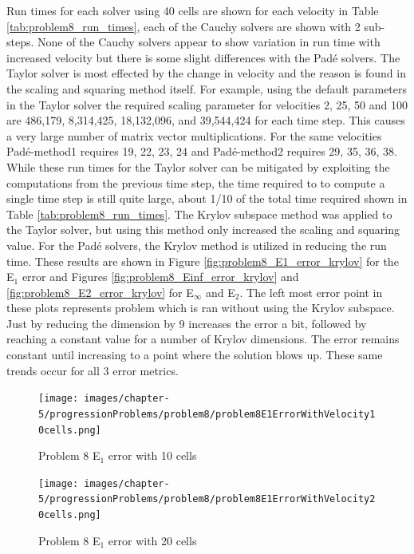 Run times for each solver using 40 cells are shown for each velocity in Table \ref{tab:problem8_run_times}, each of the Cauchy solvers are shown with 2 sub-steps. None of the Cauchy solvers appear to show variation in run time with increased velocity but there is some slight differences with the Pad\'e solvers. The Taylor solver is most effected by the change in velocity and the reason is found in the scaling and squaring method itself. For example, using the default parameters in the Taylor solver the required scaling parameter for velocities 2, 25, 50 and 100 are 486,179, 8,314,425, 18,132,096, and 39,544,424 for each time step. This causes a very large number of matrix vector multiplications. For the same velocities Pad\'e-method1 requires 19, 22, 23, 24 and Pad\'e-method2 requires 29, 35, 36, 38. While these run times for the Taylor solver can be mitigated by exploiting the computations from the previous time step, the time required to to compute a single time step is still quite large, about 1/10 of the total time required shown in Table \ref{tab:problem8_run_times}. The Krylov subspace method was applied to the Taylor solver, but using this method only increased the scaling and squaring value. For the Pad\'e solvers, the Krylov method is utilized in reducing the run time. These results are shown in Figure \ref{fig:problem8_E1_error_krylov} for the E$_{1}$ error and Figures \ref{fig:problem8_Einf_error_krylov} and \ref{fig:problem8_E2_error_krylov} for E$_{\infty}$ and E$_{2}$. The left most error point in these plots represents problem which is ran without using the Krylov subspace. Just by reducing the dimension by 9 increases the error a bit, followed by reaching a constant value for a number of Krylov dimensions. The error remains constant until increasing to a point where the solution blows up. These same trends occur for all 3 error metrics. 

\clearpage

\begin{figure}[p]
    \centering
    \texttt{[image: images/chapter-5/progressionProblems/problem8/problem8E1ErrorWithVelocity10cells.png]}
    \caption{Problem 8 E${}_{1}$ error with 10 cells}
    \label{fig:problem8_E1_error_10cells}
\end{figure}

\clearpage

\begin{figure}[p]
    \centering
    \texttt{[image: images/chapter-5/progressionProblems/problem8/problem8E1ErrorWithVelocity20cells.png]}
    \caption{Problem 8 E${}_{1}$ error with 20 cells}
    \label{fig:problem8_E1_error_20cells}
\end{figure}


